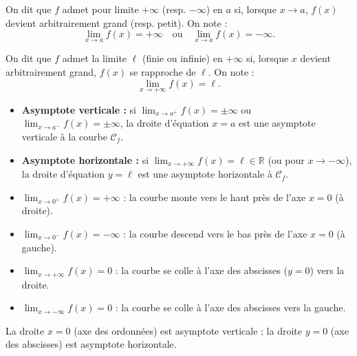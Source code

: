 \documentclass[11pt]{article}
\begin{document}
\begin{definition}
On dit que $f$ admet pour limite $+\infty$ (resp. $-\infty$) en $a$ si, lorsque $x\to a$, $f(x)$ devient arbitrairement grand (resp. petit). On note :
\[\lim_{x\to a}f(x)=+\infty \quad\text{ou}\quad \lim_{x\to a}f(x)=-\infty.\]
\end{definition}

\begin{definition}
On dit que $f$ admet la limite $\ell$ (finie ou infinie) en $+\infty$ si, lorsque $x$ devient arbitrairement grand, $f(x)$ se rapproche de $\ell$. On note :
\[\lim_{x\to+\infty}f(x)=\ell.\]
\end{definition}

\begin{propriete}[Asymptotes]
\begin{itemize}
\item \textbf{Asymptote verticale :} si $\displaystyle\lim_{x\to a^+}f(x)=\pm\infty$ ou $\displaystyle\lim_{x\to a^-}f(x)=\pm\infty$, la droite d'équation $x=a$ est une asymptote verticale à la courbe $\mathcal{C}_f$.
\item \textbf{Asymptote horizontale :} si $\displaystyle\lim_{x\to+\infty}f(x)=\ell\in\mathbb{R}$ (ou pour $x\to-\infty$), la droite d'équation $y=\ell$ est une asymptote horizontale à $\mathcal{C}_f$.
\end{itemize}
\end{propriete}

\begin{exemplebox}[Interprétation graphique : $f(x)=\dfrac{1}{x}$]
\begin{itemize}
\item $\displaystyle\lim_{x\to0^+}f(x)=+\infty$ : la courbe monte vers le haut près de l'axe $x=0$ (à droite).
\item $\displaystyle\lim_{x\to0^-}f(x)=-\infty$ : la courbe descend vers le bas près de l'axe $x=0$ (à gauche).
\item $\displaystyle\lim_{x\to+\infty}f(x)=0$ : la courbe se colle à l'axe des abscisses ($y=0$) vers la droite.
\item $\displaystyle\lim_{x\to-\infty}f(x)=0$ : la courbe se colle à l'axe des abscisses vers la gauche.
\end{itemize}
La droite $x=0$ (axe des ordonnées) est asymptote verticale ; la droite $y=0$ (axe des abscisses) est asymptote horizontale.
\end{exemplebox}
\end{document}
